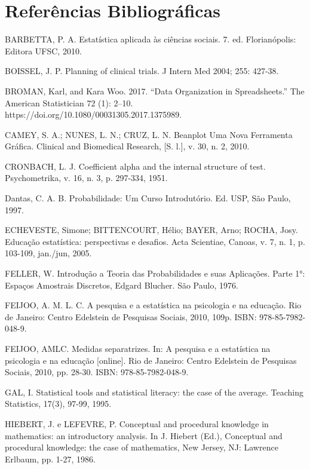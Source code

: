 \chapter{Referências Bibliográficas}

BARBETTA, P. A. Estatística aplicada às ciências sociais. 7. ed. Florianópolis: Editora UFSC, 2010.\vskip0.3cm

BOISSEL, J. P. Planning of clinical trials. J Intern Med 2004; 255: 427-38.\vskip0.3cm

BROMAN, Karl, and Kara Woo. 2017. “Data Organization in Spreadsheets.” The American Statistician 72 (1): 2–10. https://doi.org/10.1080/00031305.2017.1375989.\vskip0.3cm

CAMEY, S. A.; NUNES, L. N.; CRUZ, L. N. Beanplot Uma Nova Ferramenta Gráfica. Clinical and Biomedical Research, [S. l.], v. 30, n. 2, 2010.\vskip0.3cm

CRONBACH, L. J. Coefficient alpha and the internal structure of test. Psychometrika, v. 16, n. 3, p. 297-334, 1951.\vskip0.3cm

Dantas, C. A. B. Probabilidade: Um Curso Introdutório. Ed.
USP, São Paulo, 1997.\vskip0.3cm


ECHEVESTE, Simone; BITTENCOURT, Hélio; BAYER, Arno; ROCHA, Josy. Educação estatística: perspectivas e desafios. Acta Scientiae, Canoas, v. 7, n. 1, p. 103-109, jan./jun, 2005.\vskip0.3cm


FELLER, W. Introdução a Teoria das Probabilidades e suas
Aplicações. Parte 1°: Espaços Amostrais Discretos, Edgard Blucher. São Paulo, 1976.\vskip0.3cm

FEIJOO, A. M. L. C. A pesquisa e a estatística na psicologia e na educação. Rio de Janeiro:
Centro Edelstein de Pesquisas Sociais, 2010, 109p. ISBN: 978-85-7982-048-9.\vskip0.3cm


FEIJOO, AMLC. Medidas separatrizes. In: A pesquisa e a estatística na psicologia e na educação
[online]. Rio de Janeiro: Centro Edelstein de Pesquisas Sociais, 2010, pp. 28-30. ISBN: 978-85-7982-048-9.\vskip0.3cm



GAL, I. Statistical tools and statistical literacy: the case of the average. Teaching
Statistics, 17(3), 97-99, 1995.\vskip0.3cm

HIEBERT, J. e LEFEVRE, P. Conceptual and procedural knowledge in mathematics: an
introductory analysis. In J. Hiebert (Ed.), Conceptual and procedural knowledge: the
case of mathematics, New Jersey, NJ: Lawrence Erlbaum, pp. 1-27, 1986.\vskip0.3cm

